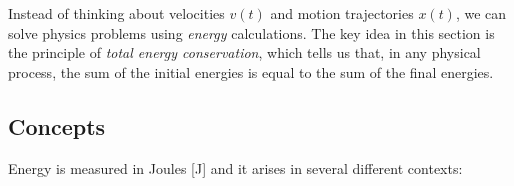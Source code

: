 \documentclass[letterpaper,9pt,journal]{IEEEtran}
\newcommand{\dokuitalic}[1]{\textsl{#1}}
\begin{document}
Instead of thinking about velocities $v(t)$ and motion trajectories $x(t)$, 
we can solve physics problems using \dokuitalic{energy} calculations.
The key idea in this section is the principle of \dokuitalic{total energy conservation}, 
which tells us that, in any physical process, 
the sum of the initial energies is equal to the sum of the final energies.

%

%

\vspace{-3mm}
\subsection{Concepts}
\label{ff4e01de0bd379280a0157bd102cc5f0}%

Energy is measured in Joules [J] and it arises in several different contexts:
\end{document}
